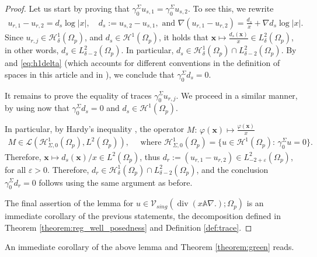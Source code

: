 \documentclass[report]{elsarticle}
\numberwithin{theorem}{section}
\renewcommand{\vec}[1]{\mathbf{#1}}
\begin{document}
\begin{proof}
	Let us start by proving that $\gamma_0^{\Sigma}u_{s,1}=\gamma_0^{\Sigma}u_{s,2}$. To see this, we rewrite 
	\begin{align}
		\label{eq:urdiff}
		u_{r,1}-u_{r,2}=d_s\log|x|, \quad d_s:=u_{s,2}-u_{s,1},\text{ and }	\nabla (u_{r,1}-u_{r,2})=\frac{d_s}{x}+\nabla d_{s}\log|x|.
	\end{align}
	Since $u_{r,j}\in \mathcal{H}^1_{\delta}(\Omega_p)$, and $d_s\in \mathcal{H}^1(\Omega_p)$, it holds that $\vec{x}\mapsto\frac{d_s(\vec{x})}{x}\in L^2_{\delta}(\Omega_p)$, in other words, $d_s\in L^2_{\delta-2}(\Omega_p)$. In particular, $d_s\in \mathcal{H}^1_{\delta}(\Omega_p)\cap L^2_{\delta-2}(\Omega_p)$. By \cite[Theorem 1.2, Proposition 1.2]{grisvard} and \eqref{eq:h1delta} (which accounts for different conventions in the definition of spaces in this article and in \cite{grisvard}), we conclude that $\gamma_0^{\Sigma}d_s=0$. 
	
	
	It remains to prove the equality of traces $\gamma_0^{\Sigma}u_{r,j}$. We proceed in a similar manner, by using now that $\gamma_0^{\Sigma}d_s=0$ and $d_s\in \mathcal{H}^1(\Omega_p)$. 
	
	
	In particular, by Hardy's inequality \cite[p.313]{brezis2010functional}, the operator 	$M:\, \varphi(\vec{x})\mapsto\frac{\varphi(\vec{x})}{x}$ 
	\begin{align}
		\label{eq:multhardy}
		M\in \mathcal{L}(\mathcal{H}^1_{\Sigma,0}(\Omega_p), L^2(\Omega_p)), \quad\text{ where } \mathcal{H}^1_{\Sigma,0}(\Omega_p)=\{u\in \mathcal{H}^1(\Omega_p): \, \gamma_0^{\Sigma}u=0\}.
	\end{align}
	Therefore, $\vec{x}\mapsto d_s(\vec{x})/x\in L^2(\Omega_p)$, thus $d_r:=(u_{r,1}-u_{r,2})\in L^2_{-2+\varepsilon}(\Omega_p)$, for all $\varepsilon>0$. Therefore, $d_r\in \mathcal{H}^1_{\delta}(\Omega_p)\cap L^2_{\delta-2}(\Omega_p)$, and the conclusion $\gamma_0^{\Sigma}d_r=0$ follows using the same argument as before.
	
	The final assertion of the lemma for $u\in \mathcal{V}_{sing}(\operatorname{div}(x\mathbb{A}\nabla.);\Omega_p)$ is an immediate corollary of the previous statements, the decomposition defined in Theorem \ref{theorem:reg_well_posedness} and Definition \ref{def:trace}. 
\end{proof}
An immediate corollary of the above lemma and Theorem \ref{theorem:green} reads. 
\end{document}
